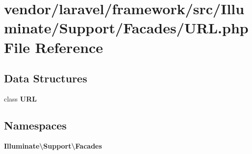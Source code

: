 \section{vendor/laravel/framework/src/\+Illuminate/\+Support/\+Facades/\+U\+R\+L.php File Reference}
\label{_u_r_l_8php}
\subsection*{Data Structures}
\begin{DoxyCompactItemize}
\item 
class {\bf U\+R\+L}
\end{DoxyCompactItemize}
\subsection*{Namespaces}
\begin{DoxyCompactItemize}
\item 
 {\bf Illuminate\textbackslash{}\+Support\textbackslash{}\+Facades}
\end{DoxyCompactItemize}
